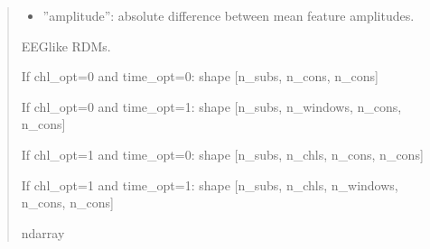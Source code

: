\documentclass[letterpaper,10pt,english]{sphinxhowto}
\begin{document}
\begin{fulllineitems}
\begin{quote}
\begin{description}
\begin{itemize}
\begin{itemize}
\item {} 
\sphinxAtStartPar
”amplitude”: absolute difference between mean feature amplitudes.

\end{itemize}


\end{itemize}

\sphinxAtStartPar

\sphinxAtStartPar
{} \textendash{} EEG\sphinxhyphen{}like RDMs.

\sphinxAtStartPar
If chl\_opt=0 and time\_opt=0:
\sphinxhyphen{} shape {[}n\_subs, n\_cons, n\_cons{]}

\sphinxAtStartPar
If chl\_opt=0 and time\_opt=1:
\sphinxhyphen{} shape {[}n\_subs, n\_windows, n\_cons, n\_cons{]}

\sphinxAtStartPar
If chl\_opt=1 and time\_opt=0:
\sphinxhyphen{} shape {[}n\_subs, n\_chls, n\_cons, n\_cons{]}

\sphinxAtStartPar
If chl\_opt=1 and time\_opt=1:
\sphinxhyphen{} shape {[}n\_subs, n\_chls, n\_windows, n\_cons, n\_cons{]}


\sphinxAtStartPar
ndarray

\end{description}\end{quote}

\end{fulllineitems}

\end{document}
